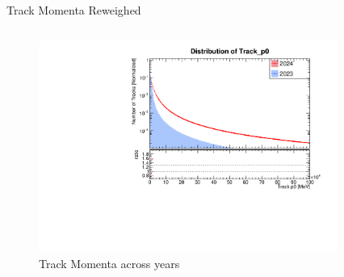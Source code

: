 
\begin{frame}{Track Momenta Reweighed}
    \begin{columns}
        \begin{column}{0.5\linewidth}
            \begin{figure}
                \includegraphics[width=\linewidth]{./ReweighedPlots/Track_p0_ratio.pdf}
                \caption{Track Momenta across years}
            \end{figure}
        \end{column}
        \begin{column}{0.5\linewidth}
            \begin{figure}

\end{figure}
\end{column}
\end{columns}
\end{frame}
